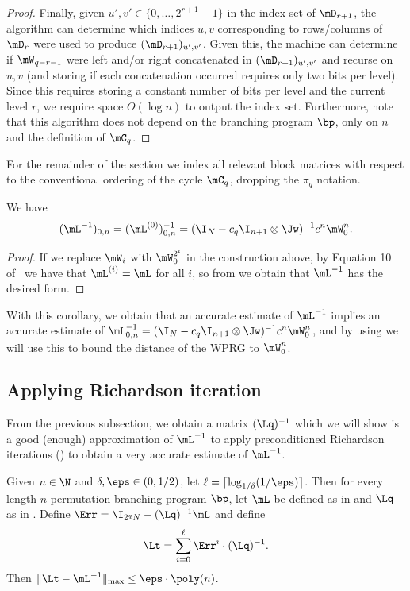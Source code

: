 \documentclass{toc}
\begin{document}
\begin{proof}
Finally, given $u',v' \in \{0,\ldots,2^{r+1}-1\}$ in the index set of $\mD_{r+1}$, the algorithm can determine which indices $u,v$ corresponding to rows/columns of $\mD_{r}$ were used to produce $(\mD_{r+1})_{u',v'}$. Given this, the machine can determine if $\mW_{q-r-1}$ were left and/or right concatenated in $(\mD_{r+1})_{u',v'}$ and recurse on $u,v$ (and storing if each concatenation occurred requires only two bits per level). Since this requires storing a constant number of bits per level and the current level $r$, we require space $O(\log n)$ to output the index set. Furthermore, note that this algorithm does not depend on the branching program $\bp$, only on $n$ and the definition of $\mC_q$.
\end{proof}
For the remainder of the section we index all relevant block matrices with respect to the conventional ordering of the cycle $\mC_q$, dropping the $\pi_q$ notation.  
\begin{corollary}\label{cor:trueCycleInverse}
We have
$$(\mL^{-1})_{0,n}=(\mL^{(0)})^{-1}_{0,n} = (\I_N-c_q\I_{n+1}\otimes\Jw)^{-1}c^n\mW_0^n.$$
\end{corollary}
\begin{proof}
  If we replace $\mW_i$ with $\mW_0^{2^i}$ in the construction above, by Equation 10 of~\cite{AhmadinejadKeMuPeSiVa19} we have that $\mL^{(i)}=\mL$ for all $i$, so from
%
we obtain that $\mL^{-1}$ has the desired form.
\end{proof}
With this corollary, we obtain that an accurate estimate of $\mL^{-1}$ implies an accurate estimate of $\mL^{-1}_{0,n}=(\I_N-c_q\I_{n+1}\otimes\Jw)^{-1}c^n\mW_0^n$, and by using  we will use this to bound the distance of the WPRG to $\mW_0^n$.

\subsection{Applying Richardson iteration}
From the previous subsection, we obtain a matrix $(\Lq)^{-1}$ which we will show is a good (enough) approximation of $\mL^{-1}$ to apply preconditioned Richardson iterations () to obtain a very accurate estimate of $\mL^{-1}$.

\begin{proposition}\label{prop:cycleEntrywise}
Given $n\in \N$ and $\delta,\eps \in (0,1/2)$, let $\ell=\lceil \log_{1/\delta}(1/\eps)\rceil$. Then for every length-$n$ permutation branching program $\bp$, let $\mL$ be defined as in  and $\Lq$ as in . Define $\Err = \I_{2^qN}-(\Lq)^{-1}\mL$ and define
$$\Lt=\sum_{i=0}^\ell \Err^i\cdot (\Lq)^{-1}.$$
Then $\|\Lt - \mL^{-1}\|_{\max}\leq \eps \cdot \poly(n)$.
\end{proposition}
\end{document}
